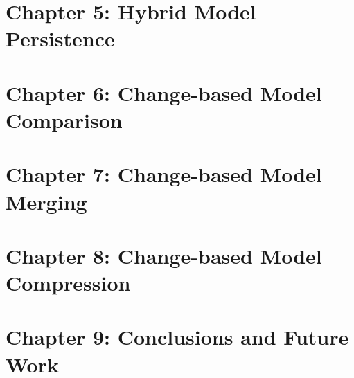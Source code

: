 \documentclass[12pt, a4paper]{report} \usepackage[titletoc]{appendix}
\begin{document}
\section{Chapter 5: Hybrid Model Persistence}
\label{sec:chapter_5_hybrid_model_persistence_plan}

\section{Chapter 6: Change-based Model Comparison}
\label{sec:chapter_6_change_based_model_comparison_plan}

\section{Chapter 7: Change-based Model Merging}
\label{sec:chapter_7_change_based_model_merging_plan}

\section{Chapter 8: Change-based Model Compression}
\label{sec:chapter_8_change_based_model_compression_plan}

\section{Chapter 9: Conclusions and Future Work}
\label{sec:chapter_9_conclusions_plan}


\end{document}
